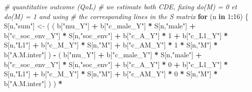 \documentclass[
]{book}
\newenvironment{Shaded}{\begin{snugshade}}{\end{snugshade}}
\newcommand{\CommentTok}[1]{\textcolor[rgb]{0.56,0.35,0.01}{\textit{#1}}}
\newcommand{\ControlFlowTok}[1]{\textcolor[rgb]{0.13,0.29,0.53}{\textbf{#1}}}
\newcommand{\DecValTok}[1]{\textcolor[rgb]{0.00,0.00,0.81}{#1}}
\newcommand{\NormalTok}[1]{#1}
\newcommand{\OtherTok}[1]{\textcolor[rgb]{0.56,0.35,0.01}{#1}}
\newcommand{\SpecialCharTok}[1]{\textcolor[rgb]{0.81,0.36,0.00}{\textbf{#1}}}
\newcommand{\StringTok}[1]{\textcolor[rgb]{0.31,0.60,0.02}{#1}}
\begin{document}
\begin{Shaded}
\begin{Highlighting}[]
  \CommentTok{\# quantitative outcome (QoL)}
  \CommentTok{\# we estimate both CDE, fixing do(M) = 0 et do(M) = 1 and using }
  \CommentTok{\# the corresponding lines in the S matrix}
  \ControlFlowTok{for}\NormalTok{ (n }\ControlFlowTok{in} \DecValTok{1}\SpecialCharTok{:}\DecValTok{16}\NormalTok{) \{}
\NormalTok{    S[n,}\StringTok{"sum"}\NormalTok{] }\OtherTok{\textless{}{-}}\NormalTok{ ( ( b[}\StringTok{"mu\_Y"}\NormalTok{] }\SpecialCharTok{+} 
\NormalTok{                        b[}\StringTok{"c\_male\_Y"}\NormalTok{] }\SpecialCharTok{*}\NormalTok{ S[n,}\StringTok{"male"}\NormalTok{] }\SpecialCharTok{+} 
\NormalTok{                        b[}\StringTok{"c\_soc\_env\_Y"}\NormalTok{] }\SpecialCharTok{*}\NormalTok{ S[n,}\StringTok{"soc\_env"}\NormalTok{] }\SpecialCharTok{+} 
\NormalTok{                        b[}\StringTok{"c\_A\_Y"}\NormalTok{] }\SpecialCharTok{*} \DecValTok{1} \SpecialCharTok{+} 
\NormalTok{                        b[}\StringTok{"c\_L1\_Y"}\NormalTok{] }\SpecialCharTok{*}\NormalTok{ S[n,}\StringTok{"L1"}\NormalTok{] }\SpecialCharTok{+}
\NormalTok{                        b[}\StringTok{"c\_M\_Y"}\NormalTok{] }\SpecialCharTok{*}\NormalTok{ S[n,}\StringTok{"M"}\NormalTok{] }\SpecialCharTok{+}
\NormalTok{                        b[}\StringTok{"c\_AM\_Y"}\NormalTok{] }\SpecialCharTok{*} \DecValTok{1} \SpecialCharTok{*}\NormalTok{ S[n,}\StringTok{"M"}\NormalTok{] }\SpecialCharTok{*}\NormalTok{ b[}\StringTok{"A.M.inter"}\NormalTok{] ) }\SpecialCharTok{{-}} 
\NormalTok{                      ( b[}\StringTok{"mu\_Y"}\NormalTok{] }\SpecialCharTok{+} 
\NormalTok{                          b[}\StringTok{"c\_male\_Y"}\NormalTok{] }\SpecialCharTok{*}\NormalTok{ S[n,}\StringTok{"male"}\NormalTok{] }\SpecialCharTok{+} 
\NormalTok{                          b[}\StringTok{"c\_soc\_env\_Y"}\NormalTok{] }\SpecialCharTok{*}\NormalTok{ S[n,}\StringTok{"soc\_env"}\NormalTok{] }\SpecialCharTok{+} 
\NormalTok{                          b[}\StringTok{"c\_A\_Y"}\NormalTok{] }\SpecialCharTok{*} \DecValTok{0} \SpecialCharTok{+} 
\NormalTok{                          b[}\StringTok{"c\_L1\_Y"}\NormalTok{] }\SpecialCharTok{*}\NormalTok{ S[n,}\StringTok{"L1"}\NormalTok{] }\SpecialCharTok{+}
\NormalTok{                          b[}\StringTok{"c\_M\_Y"}\NormalTok{] }\SpecialCharTok{*}\NormalTok{ S[n,}\StringTok{"M"}\NormalTok{] }\SpecialCharTok{+}
\NormalTok{                          b[}\StringTok{"c\_AM\_Y"}\NormalTok{] }\SpecialCharTok{*} \DecValTok{0} \SpecialCharTok{*}\NormalTok{ S[n,}\StringTok{"M"}\NormalTok{] }\SpecialCharTok{*}\NormalTok{ b[}\StringTok{"A.M.inter"}\NormalTok{] ) ) }\SpecialCharTok{*}

\end{Highlighting}
\end{Shaded}
\end{document}
